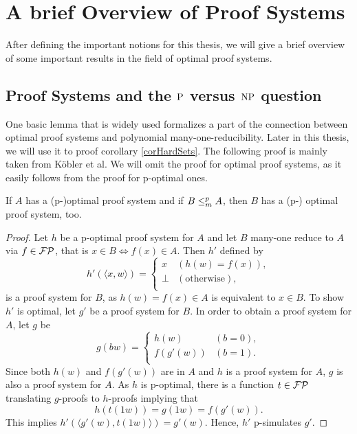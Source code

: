 \chapter{A brief Overview of Proof Systems} \label{chpOverview}
  After defining the important notions for this thesis, we will give a brief overview of some important results in the field of optimal proof systems.

  \section{Proof Systems and the $\P$ versus $\NP$ question}
  
  One basic lemma that is widely used formalizes a part of the connection between optimal proof systems and polynomial many-one-reducibility. Later in this thesis, we will use it to proof corollary \ref{corHardSets}. The following proof is mainly taken from Köbler et al. We will omit the proof for optimal proof systems, as it easily follows from the proof for p-optimal ones.

  \begin{lemma} \label{lemManyOneProofSystem}
    If \(A\) has a (p-)optimal proof system and if \(B \redmany A\), then \(B\) has a (p-) optimal proof system, too.
  \end{lemma}

  \begin{proof}
    Let \(h\) be a p-optimal proof system for \(A\) and let \(B\) many-one reduce to \(A\) via \(f \in \FP\), that is \(x \in B \Leftrightarrow f(x) \in A\). Then \(h'\) defined by
      \[
        h'(\langle x, w \rangle) =
        \begin{cases}
          x & (h(w) = f(x)), \\
          \perp & (\text{otherwise}), \\
        \end{cases}
      \]
    is a proof system for \(B\), as \(h(w) = f(x) \in A\) is equivalent to \(x \in B\). To show \(h'\) is optimal, let \(g'\) be a proof system for \(B\). In order to obtain a proof system for \(A\), let \(g\) be
      \[
        g(bw) =
        \begin{cases}
          h(w) & (b = 0), \\
          f(g'(w)) & (b = 1). \\
        \end{cases}
      \]
    Since both \(h(w)\) and \(f(g'(w))\) are in \(A\) and \(h\) is a proof system for \(A\), \(g\) is also a proof system for \(A\). As \(h\) is p-optimal, there is a function \(t \in \FP\) translating \(g\)-proofs to \(h\)-proofs implying that
    \[
      h(t(1w)) = g(1w) = f(g'(w)).
    \]
    This implies \(h'(\langle g'(w), t(1w) \rangle ) = g'(w)\). Hence, \(h'\) p-simulates \(g'\).
  \end{proof}

